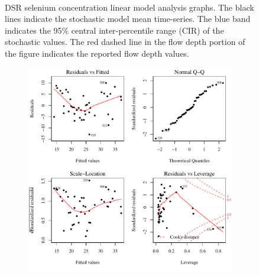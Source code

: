 \begin{linenumbers}
\begin{landscape}
\begin{figure}
\begin{subfigure}{0.7\textwidth}
		\end{subfigure}\\
		\caption[DSR selenium concentration linear model analysis graphs.]{DSR selenium concentration linear model analysis graphs. The black lines indicate the stochastic model mean time-series.  The blue band indicates the 95\% central inter-percentile range (CIR) of the stochastic values.  The red dashed line in the flow depth portion of the figure indicates the reported flow depth values.}
		\label{fig:concLmFit_DS}
	\end{figure}
\end{landscape}

\subfiguremid
\begin{landscape}
	\begin{figure}
		\begin{subfigure}{0.7\textwidth}
			\centering
			\includegraphics[width=\tableCustomSize]{"Figures/Results_DSR/Stochastic/Conc Model lm-fit BIG"}
		\end{subfigure}%
		\begin{subfigure}{0.7\textwidth}
			\centering

\end{subfigure}
\end{figure}
\end{landscape}
\end{linenumbers}
